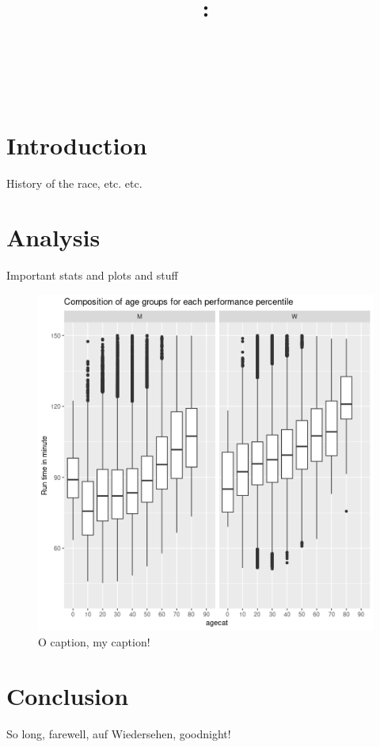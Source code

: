 \documentclass[12pt]{article}
\title{\large\COURSENUMB:\\\COURSENAME\\~\\\ASSIGNMENTNAME}
\author{\MYNAME}
\date{\SUBMISSIONDATE}
\begin{document}
\maketitle


\section*{Introduction}

	History of the race, etc. etc.

\section*{Analysis}

	Important stats and plots and stuff

	\begin{figure}[t]
		\centering
		\includegraphics[width=0.5\linewidth]
		{../figure/boxplot_runtime_age-1.png}
		\caption{O caption, my caption!}
		\label{fig1}
	\end{figure}

\section*{Conclusion}

	So long, farewell, auf Wiedersehen, goodnight!
\end{document}
